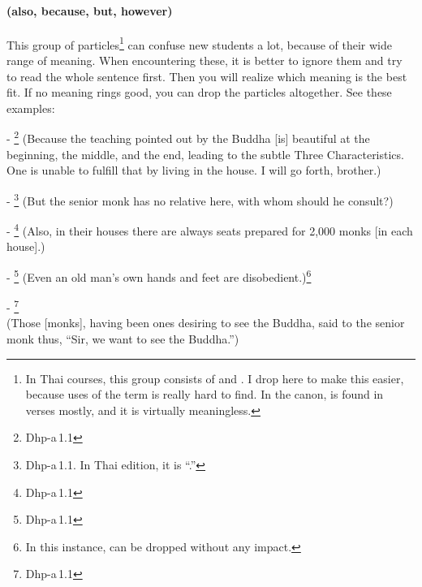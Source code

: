 \paragraph*{ (also, because, but, however)} This group of particles\footnote{In Thai courses, this group consists of  and . I drop  here to make this easier, because uses of the term is really hard to find. In the canon,  is found in verses mostly, and it is virtually meaningless.} can confuse new students a lot, because of their wide range of meaning. When encountering these, it is better to ignore them and try to read the whole sentence first. Then you will realize which meaning is the best fit. If no meaning rings good, you can drop the particles altogether. See these examples:\par
- \footnote{Dhp-a\,1.1} (Because the teaching pointed out by the Buddha [is] beautiful at the beginning, the middle, and the end, leading to the subtle Three Characteristics. One is unable to fulfill that by living in the house. I will go forth, brother.)\par
- \footnote{Dhp-a\,1.1. In Thai edition, it is ``.''} (But the senior monk has no relative here, with whom should he consult?)\par
- \footnote{Dhp-a\,1.1} (Also, in their houses there are always seats prepared for 2,000 monks [in each house].)\par
- \footnote{Dhp-a\,1.1} (Even an old man's own hands and feet are disobedient.)\footnote{In this instance,  can be dropped without any impact.}\par
- \footnote{Dhp-a\,1.1} \\(Those [monks], having been ones desiring to see the Buddha, said to the senior monk thus, ``Sir, we want to see the Buddha.'')\par

